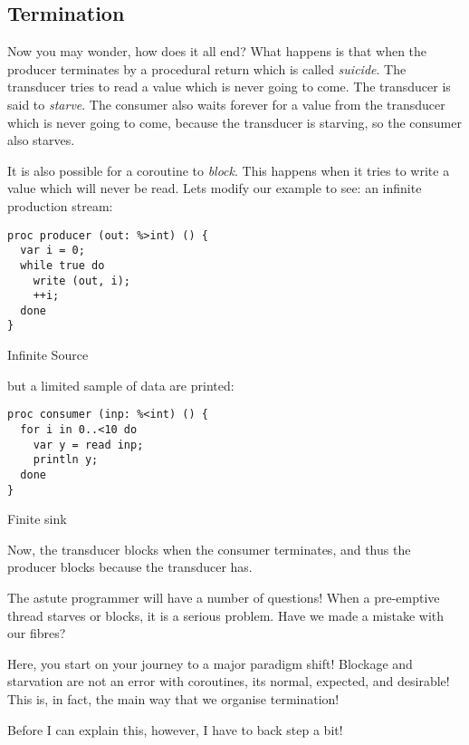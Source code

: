 \documentclass[oneside]{book}
\begin{document}
\subsection{Termination}
Now you may wonder, how does it all end? What happens is that
when the producer terminates by a procedural return which is
called {\em suicide}. The transducer tries to read a value
which is never going to come. The transducer is said to {\em starve}.
The consumer also waits forever for a value from the transducer
which is never going to come, because the transducer is starving,
so the consumer also starves.

It is also possible for a coroutine to {\em block}. This happens when
it tries to write a value which will never be read. Lets modify
our example to see: an infinite production stream:

\begin{listing}[h]
\begin{verbatim}
proc producer (out: %>int) () {
  var i = 0;
  while true do
    write (out, i);
    ++i;
  done
}
\end{verbatim}
\caption{Infinite Source}
\label{lst:infinite source}
\end{listing}

but a limited sample of data are printed:

\begin{listing}
\begin{verbatim}
proc consumer (inp: %<int) () {
  for i in 0..<10 do
    var y = read inp;
    println y;
  done
}
\end{verbatim}
\caption{Finite sink}
\label{lst:finite sink}
\end{listing}

Now, the transducer blocks when the consumer terminates, and thus
the producer blocks because the transducer has.

The astute programmer will have a number of questions!
When a pre-emptive thread starves or blocks, it is a serious
problem. Have we made a mistake with our fibres?

Here, you start on your journey to a major paradigm shift!
Blockage and starvation are not an error with coroutines,
its normal, expected, and desirable! This is, in fact,
the main way that we organise termination!

Before I can explain this, however, I have to back step a bit!
\end{document}
